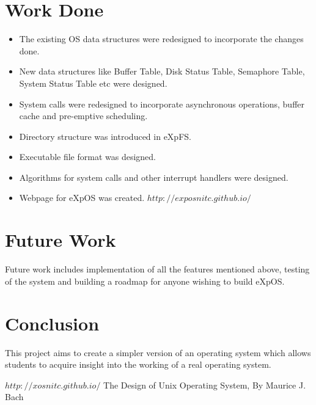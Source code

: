 \documentclass[10pt]{article}
\begin{document}
\section{Work Done}
\begin {itemize}
\item The existing OS data structures were redesigned to incorporate the changes done. 
\item New data structures like Buffer Table, Disk Status Table, Semaphore Table, System Status Table etc were designed.
\item System calls were redesigned to incorporate asynchronous operations, buffer cache and pre-emptive scheduling.
\item Directory structure was introduced in eXpFS.
\item Executable file format was designed.
\item Algorithms for system calls and other interrupt handlers were designed.
\item Webpage for eXpOS was created. \texttt{$http://exposnitc.github.io/$}
\end{itemize}
 
\section{Future Work}
Future work includes implementation of all the features mentioned above, testing of the system and building a roadmap for anyone wishing to build eXpOS.
\section{Conclusion}
This project aims to create a simpler version of an operating system which allows students to acquire insight into the working of a real operating system. 

\begin{thebibliography}{1}
\texttt{$http://xosnitc.github.io/$}
 The Design of Unix Operating System, By Maurice J. Bach
\end{thebibliography}
\end{document}
